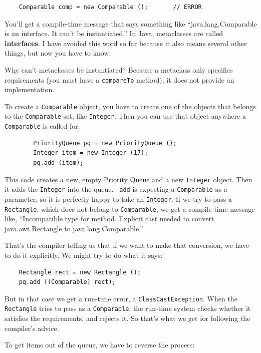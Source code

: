 \documentclass[12pt]{book}
\theoremstyle{exercise}
\begin{document}
\begin{verbatim}
    Comparable comp = new Comparable ();       // ERROR
\end{verbatim}
%
You'll get a compile-time message that says something like
``java.lang.Comparable is an interface.  It can't be instantiated.''
In Java, metaclasses are called {\bf interfaces}.  I have
avoided this word so far because it also means several other
things, but now you have to know.


Why can't metaclasses be instantiated?  Because a metaclass
only specifies requirements (you must have a {\tt compareTo}
method); it does not provide an implementation.

To create a {\tt Comparable} object, you have to create one of the
objects that belongs to the {\tt Comparable} set, like {\tt Integer}.
Then you can use that object anywhere a {\tt Comparable} is called
for.

\begin{verbatim}
        PriorityQueue pq = new PriorityQueue ();
        Integer item = new Integer (17);
        pq.add (item);
\end{verbatim}
%
This code creates a new, empty Priority Queue and a new {\tt Integer}
object.  Then it adds the {\tt Integer} into the queue.  {\tt
add} is expecting a {\tt Comparable} as a parameter, so it is
perfectly happy to take an {\tt Integer}.  If we try to pass a {\tt
Rectangle}, which does not belong to {\tt Comparable}, we get a
compile-time message like, ``Incompatible type for method.  Explicit
cast needed to convert java.awt.Rectangle to java.lang.Comparable.''

That's the compiler telling us that if we want to make that conversion,
we have to do it explicitly.  We might try to do what it says:

\begin{verbatim}
	Rectangle rect = new Rectangle ();
	pq.add ((Comparable) rect);
\end{verbatim}
%
But in that case we get a run-time error, a {\tt ClassCastException}.
When the {\tt Rectangle} tries to pass as a {\tt Comparable}, the
run-time system checks whether it satisfies the requirements, and
rejects it.  So that's what we get for following the compiler's advice.


To get items out of the queue, we have to reverse the process:
\end{document}
